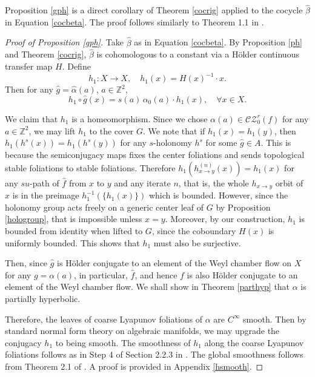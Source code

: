 \documentclass[11pt]{amsart}
\numberwithin{equation}{section}
\newcommand{\Z}{\mathbb{Z}}
\newcommand{\CZ}{\mathcal{CZ}}
\theoremstyle{plain}
\begin{document}
Proposition \ref{gph} is a direct corollary of Theorem \ref{cocrig} applied to the cocycle $\hat{\beta}$ in Equation \eqref{cocbeta}. The proof follows similarly to Theorem 1.1 in \cite{DK}.

\begin{proof}[Proof of Proposition \ref{gph}]
Take $\hat{\beta}$ as in Equation \eqref{cocbeta}. By Proposition \ref{ph} and Theorem \ref{cocrig}, $\hat{\beta}$ is cohomologous to a constant via a H\"older continuous transfer map $H$. Define
\[
h_1: X \to X, \quad h_1(x) = H(x)^{-1} \cdot x.
\]
Then for any $\hat{g} = \hat{\alpha}(a)$, $a \in \Z^2$,
\begin{equation}\label{chomg}
h_1 \circ \hat{g}(x) = s(a) \, \alpha_0(a) \cdot h_1(x), \quad \forall x \in X.
\end{equation}

We claim that $h_1$ is a homeomorphism.
Since we chose $\alpha(a)\in \CZ^r_0(f)$ for any $ a\in \Z^2$, we may lift $h_1$ to the cover $G$. We note that if $h_1(x)=h_1(y)$, then $h_1(h^s(x))=h_1(h^s(y))$ for any $s$-holonomy $h^s$ for some $\hat{g}\in A$. This is because the semiconjugacy maps fixes the center foliations and sends topological stable foliations to stable foliations. Therefore $h_1(h^{(n)}_{x\to y}(x))=h_1(x)$ for any $su$-path of $\hat{f}$ from $x$ to $y$ and any iterate $n$, that is, the whole $h_{x\to y}$ orbit of $x$ is in the preimage $h_1^{-1}(\{h_1(x)\})$ which is bounded. However, since the holonomy group acts freely on a generic center leaf of $G$ by Proposition \ref{hologroup}, that is impossible unless $x=y$. Moreover, by our construction, $h_1$ is bounded from identity when lifted to $G$, since the coboundary $H(x)$ is uniformly bounded. This shows that $h_1$ must also be surjective.

 Then, since $\hat{g}$ is H\"older conjugate to an element of the Weyl chamber flow on $X$ for any $g=\alpha(a)$, in particular, $\hat{f}$, and hence $f$ is also H\"older conjugate to an element of the Weyl chamber flow. We shall show in Theorem \ref{parthyp} that $\alpha$ is partially hyperbolic. 
 
 Therefore, the leaves of coarse Lyapunov foliations of $\alpha$ are $C^\infty$ smooth. Then by standard normal form theory on algebraic manifolds, we may upgrade the conjugacy $h_1$ to being smooth. The smoothness of $h_1$ along the coarse Lyapunov foliations follows as in Step 4 of Section 2.2.3 in \cite{KS}. The global smoothness follows from Theorem 2.1 of \cite{KSpat}. A proof is provided in Appendix \ref{hsmooth}.
\end{proof}
\end{document}
